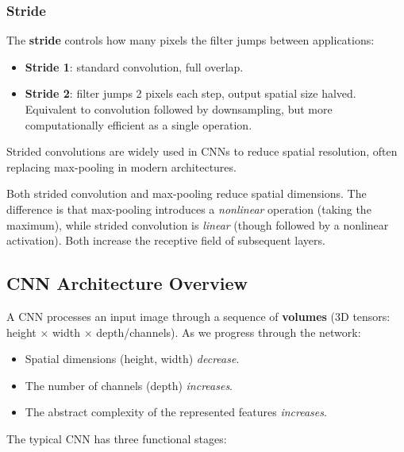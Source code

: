 \documentclass[11pt,a4paper]{article}
\newcommand{\term}[1]{\textcolor{DefGreen}{\textbf{#1}}\index{#1}}
\begin{document}
\subsubsection{Stride}

The \term{stride} controls how many pixels the filter jumps between applications:
\begin{itemize}
  \item \textbf{Stride 1}: standard convolution, full overlap.
  \item \textbf{Stride 2}: filter jumps 2 pixels each step, output spatial size halved. Equivalent to convolution followed by downsampling, but more computationally efficient as a single operation.
\end{itemize}
Strided convolutions are widely used in CNNs to reduce spatial resolution, often replacing max-pooling in modern architectures.

\begin{warnbox}
Both strided convolution and max-pooling reduce spatial dimensions. The difference is that max-pooling introduces a \emph{nonlinear} operation (taking the maximum), while strided convolution is \emph{linear} (though followed by a nonlinear activation). Both increase the receptive field of subsequent layers.
\end{warnbox}

\subsection{CNN Architecture Overview}

A CNN processes an input image through a sequence of \term{volumes} (3D tensors: height $\times$ width $\times$ depth/channels). As we progress through the network:
\begin{itemize}
  \item Spatial dimensions (height, width) \emph{decrease}.
  \item The number of channels (depth) \emph{increases}.
  \item The abstract complexity of the represented features \emph{increases}.
\end{itemize}

The typical CNN has three functional stages:
\end{document}
